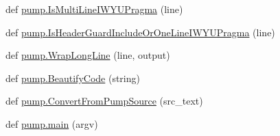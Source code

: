 \begin{DoxyCompactItemize}
\item 
def \mbox{\hyperlink{namespacepump_a707a3ff4514c89607e48a87589aed787}{pump.\+Is\+Multi\+Line\+I\+W\+Y\+U\+Pragma}} (line)
\item 
def \mbox{\hyperlink{namespacepump_ac8a553b60dc83d100361a0e98d98451b}{pump.\+Is\+Header\+Guard\+Include\+Or\+One\+Line\+I\+W\+Y\+U\+Pragma}} (line)
\item 
def \mbox{\hyperlink{namespacepump_a02427e2ddc80f0f408e27dfc3e38e702}{pump.\+Wrap\+Long\+Line}} (line, output)
\item 
def \mbox{\hyperlink{namespacepump_a3456db8d85605892d670669c4e238cd7}{pump.\+Beautify\+Code}} (string)
\item 
def \mbox{\hyperlink{namespacepump_a568fe53d1443489ac15bac4a0f9faf91}{pump.\+Convert\+From\+Pump\+Source}} (src\+\_\+text)
\item 
def \mbox{\hyperlink{namespacepump_abcf26971f7bdbad77c2c168c110312df}{pump.\+main}} (argv)
\end{DoxyCompactItemize}
